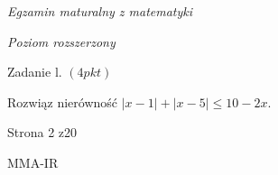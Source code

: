 \documentclass[a4paper,12pt]{article}
\begin{document}
{\it Egzamin maturalny z matematyki}

{\it Poziom rozszerzony}

Zadanie l. $(4pkt)$

Rozwiąz nierówność $|x-1|+|x-5|\leq 10-2x.$

Strona 2 z20

MMA-IR
\end{document}
